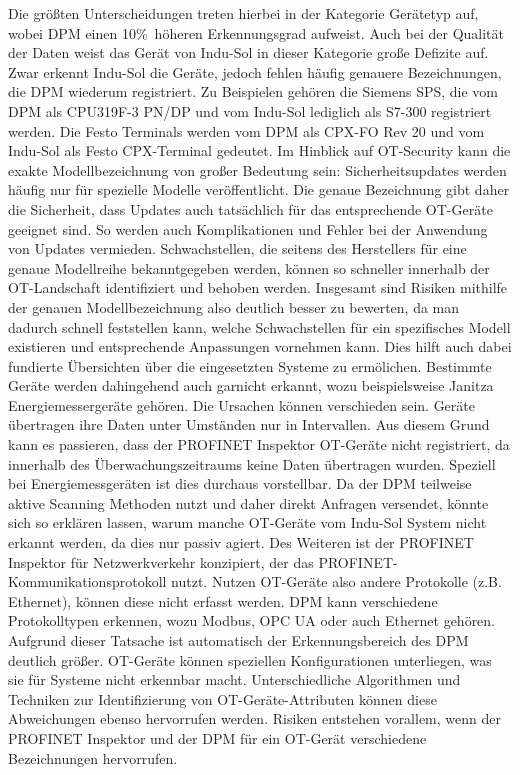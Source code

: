 \noindent Die größten Unterscheidungen treten hierbei in der Kategorie Gerätetyp auf, wobei DPM einen 10\%\ höheren Erkennungsgrad aufweist. Auch bei der Qualität der Daten weist das Gerät von Indu-Sol in dieser Kategorie große Defizite auf. Zwar erkennt Indu-Sol die Geräte, jedoch fehlen häufig genauere Bezeichnungen, die DPM wiederum registriert. Zu Beispielen gehören die Siemens SPS, die vom DPM als CPU319F-3 PN/DP und vom Indu-Sol lediglich als S7-300 registriert werden. Die Festo Terminals werden vom DPM als CPX-FO Rev 20 und vom Indu-Sol als Festo CPX-Terminal gedeutet. Im Hinblick auf OT-Security kann die exakte Modellbezeichnung von großer Bedeutung sein: Sicherheitsupdates werden häufig nur für spezielle Modelle veröffentlicht. Die genaue Bezeichnung gibt daher die Sicherheit, dass Updates auch tatsächlich für das entsprechende OT-Geräte geeignet sind. So werden auch Komplikationen  und Fehler bei der Anwendung von Updates vermieden.  Schwachstellen, die seitens des Herstellers für eine genaue Modellreihe bekanntgegeben werden, können so schneller innerhalb der OT-Landschaft identifiziert und behoben werden. Insgesamt sind Risiken mithilfe der genauen Modellbezeichnung also deutlich besser zu bewerten, da man dadurch schnell feststellen kann, welche Schwachstellen für ein spezifisches Modell existieren und entsprechende Anpassungen vornehmen kann. Dies hilft auch dabei fundierte Übersichten über die eingesetzten Systeme zu ermölichen. Bestimmte Geräte werden dahingehend auch garnicht erkannt, wozu beispielsweise Janitza Energiemessergeräte gehören. Die Ursachen können verschieden sein. Geräte übertragen ihre Daten unter Umständen nur in Intervallen. Aus diesem Grund kann es passieren, dass der PROFINET Inspektor OT-Geräte nicht registriert, da innerhalb des Überwachungszeitraums keine Daten übertragen wurden. Speziell bei Energiemessgeräten ist dies durchaus vorstellbar. Da der DPM teilweise aktive Scanning Methoden nutzt und daher direkt Anfragen versendet, könnte sich so erklären lassen, warum manche OT-Geräte vom Indu-Sol System nicht erkannt werden, da dies nur passiv agiert. Des Weiteren ist der PROFINET Inspektor für Netzwerkverkehr konzipiert, der das PROFINET-Kommunikationsprotokoll nutzt. Nutzen OT-Geräte also andere Protokolle (z.B. Ethernet), können diese nicht erfasst werden. DPM kann verschiedene Protokolltypen erkennen, wozu Modbus, OPC UA oder auch Ethernet gehören. Aufgrund dieser Tatsache ist automatisch der Erkennungsbereich des DPM deutlich größer. OT-Geräte können speziellen Konfigurationen unterliegen, was sie für Systeme nicht erkennbar macht. Unterschiedliche Algorithmen und Techniken zur Identifizierung von OT-Geräte-Attributen können diese Abweichungen ebenso hervorrufen werden. Risiken entstehen vorallem, wenn der PROFINET Inspektor und der DPM für ein OT-Gerät verschiedene Bezeichnungen hervorrufen. 
